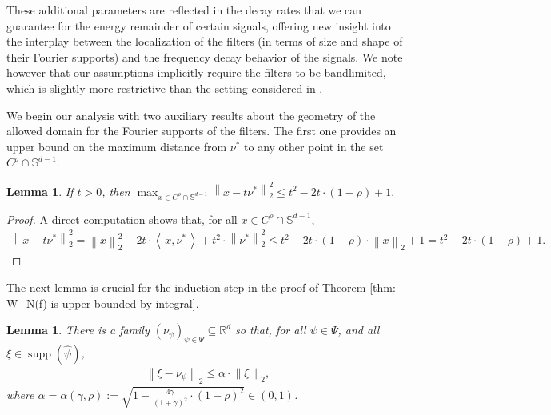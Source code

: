\documentclass[11pt]{amsart}
\newcommand{\R}{{\mathbb{R}}}
\newcommand{\norm}[1]{\ensuremath{\left\lVert\text{}#1\text{}\right\rVert}}
\newcommand{\ip}[1]{\ensuremath{\left<\text{} \, #1 \, \text{}\right>}}
\DeclareMathOperator{\supp}{supp}
\newtheorem{lemma}[theorem]{Lemma}
\newenvironment{proof sketch} {\textit{Proof sketch.}}{}
\begin{document}
  These additional parameters are reflected in the decay rates that we can guarantee for the energy remainder of certain signals, offering new insight into the interplay between the localization of the filters (in terms of size and shape of their Fourier supports) and the frequency decay behavior of the signals. We note however that our assumptions implicitly require the filters to be bandlimited, which is slightly more restrictive than the setting considered in \cite[Assumption 1]{wiatowski2017energy}. 
  
  
  We begin our analysis with two auxiliary results about the geometry of the allowed domain for the Fourier supports of the filters. The first one provides an upper bound on the maximum distance from $\nu^*$ to any other point in the set $C^\rho \cap \mathbb{S}^{d-1}$. 
  \begin{lemma}\label{lemma: maximum distance to v*}
    If $t>0$, then $\max_{x \in C^\rho \cap \mathbb{S}^{d-1}} \norm{x-t\nu^*}_2^2\leq t^2-2t \cdot (1-\rho)+1.$
  \end{lemma}
  
  \begin{proof}
    A direct computation shows that, for all $x \in C^\rho \cap \mathbb{S}^{d-1}$,
    \begin{align*}
      \norm{x-t\nu^*}_2^2 = \norm{x}_2^2 - 2t \cdot \ip{x,\nu^*} + t^2 \cdot \norm{\nu^*}_2^2 \leq t^2-2t \cdot (1-\rho) \cdot \norm{x}_2+1 = t^2-2t \cdot (1-\rho)+1.
    \end{align*}
  \end{proof}
  
  The next lemma is crucial for the induction step in the proof of Theorem \ref{thm: W_N(f) is upper-bounded by integral}. 
  
  \begin{lemma}\label{lem: how alpha comes into play}
    There is a family $(\nu_\psi)_{\psi \in \Psi}\subseteq \R^d$ so that, for all $\psi \in \Psi$, and all $\xi \in \supp(\widehat{\psi})$,
    \begin{align*}
      \norm{\xi-\nu_\psi}_2\leq \alpha \cdot \norm{\xi}_2,
    \end{align*}
    where $\alpha=\alpha(\gamma,\rho):=\sqrt{1-\frac{4\gamma}{(1+\gamma)^2}\cdot (1-\rho)^2}\in (0,1)$.
  \end{lemma}
  
\end{document}

